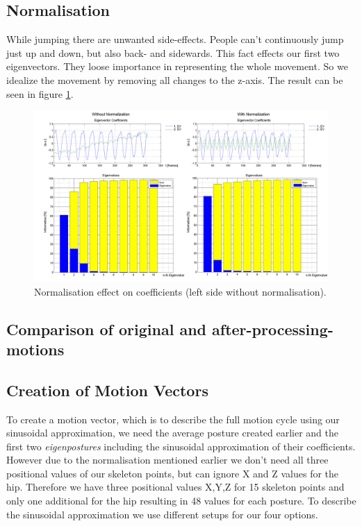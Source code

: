 \documentclass[a4paper]{article}
\begin{document}
\subsection{Normalisation}
While jumping there are unwanted side-effects. People can't continuously jump just up and down, but also back- and sidewards. This fact effects our first two eigenvectors. They loose importance in representing the whole movement. So we idealize the movement by removing all changes to the z-axis. The result can be seen in figure \ref{fig:sammel}.


\begin{figure}
	\centering
	\includegraphics[width=15cm]{sammel.png}
	\caption{Normalisation effect on coefficients (left side without normalisation).}
	\label{fig:sammel}
\end{figure}

\subsection{Comparison of original and after-processing-motions}


\subsection{Creation of Motion Vectors}
To create a motion vector, which is to describe the full motion cycle using our sinusoidal approximation, we need the average posture created earlier and the first two \emph{eigenpostures} including the sinusoidal approximation of their coefficients.
However due to the normalisation mentioned earlier we don't need all three positional values of our skeleton points, but can ignore X and Z values for the hip.
Therefore we have three positional values X,Y,Z for 15 skeleton points and only one additional for the hip resulting in 48 values for each posture.
To describe the sinusoidal approximation we use different setups for our four options.
\end{document}

